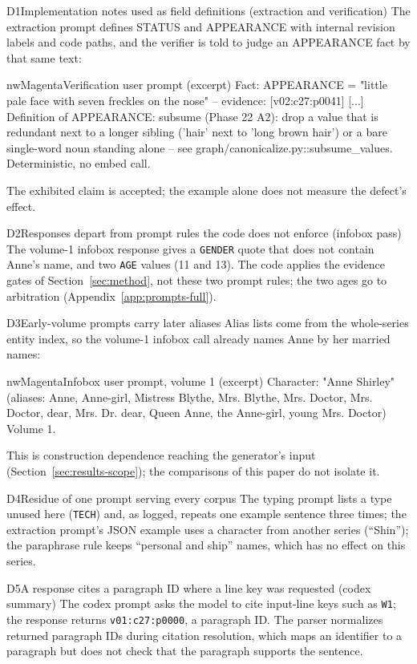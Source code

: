 \begin{nwdefect}{D1\enspace Implementation notes used as field definitions (extraction and verification)}
The extraction prompt defines STATUS and APPEARANCE with internal revision labels and code
paths, and the verifier is told to judge an APPEARANCE fact by that same text:
\begin{nwprompt}{nwMagenta}{Verification user prompt (excerpt)}
Fact: APPEARANCE = "little pale face with seven freckles on the nose" -- evidence: [v02:c27:p0041] [...]
Definition of APPEARANCE: subsume (Phase 22 A2): drop a value that is redundant next to a longer sibling ('hair' next to 'long brown hair') or a bare single-word noun standing alone -- see graph/canonicalize.py::subsume_values. Deterministic, no embed call.
\end{nwprompt}
The exhibited claim is accepted; the example alone does not measure the defect's effect.
\end{nwdefect}

\begin{nwdefect}{D2\enspace Responses depart from prompt rules the code does not enforce (infobox pass)}
The volume-1 infobox response gives a \texttt{GENDER} quote that does not contain Anne's
name, and two \texttt{AGE} values (11 and 13). The code applies the evidence gates of
Section~\ref{sec:method}, not these two prompt rules; the two ages go to arbitration
(Appendix~\ref{app:prompts-full}).
\end{nwdefect}

\begin{nwdefect}{D3\enspace Early-volume prompts carry later aliases}
Alias lists come from the whole-series entity index, so the volume-1 infobox call already
names Anne by her married names:
\begin{nwprompt}{nwMagenta}{Infobox user prompt, volume 1 (excerpt)}
Character: "Anne Shirley" (aliases: Anne, Anne-girl, Mistress Blythe, Mrs. Blythe, Mrs. Doctor, Mrs. Doctor, dear, Mrs. Dr. dear, Queen Anne, the Anne-girl, young Mrs. Doctor)
Volume 1.
\end{nwprompt}
This is construction dependence reaching the generator's input
(Section~\ref{sec:results-scope}); the comparisons of this paper do not isolate it.
\end{nwdefect}


\begin{nwdefect}{D4\enspace Residue of one prompt serving every corpus}
The typing prompt lists a type unused here (\texttt{TECH}) and, as logged, repeats one example
sentence three times; the extraction prompt's JSON example uses a character from another
series (``Shin''); the paraphrase rule keeps ``personal and ship'' names, which has no effect
on this series.
\end{nwdefect}
\begin{nwdefect}{D5\enspace A response cites a paragraph ID where a line key was requested (codex summary)}
The codex prompt asks the model to cite input-line keys such as \texttt{W1}; the response
returns \texttt{v01:c27:p0000}, a paragraph ID. The parser normalizes returned paragraph IDs
during citation resolution, which maps an identifier to a paragraph but does not check that
the paragraph supports the sentence.
\end{nwdefect}
\endgroup
